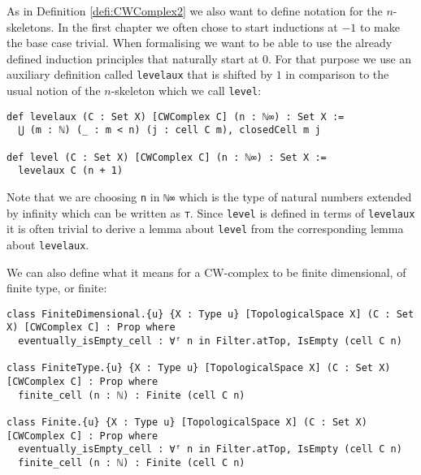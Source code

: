 As in Definition \ref{defi:CWComplex2} we also want to define notation for the $n$-skeletons.
In the first chapter we often chose to start inductions at $-1$ to make the base case trivial.
When formalising we want to be able to use the already defined induction principles that naturally start at $0$.
For that purpose we use an auxiliary definition called \lstinline{levelaux} that is shifted by $1$ in comparison to the usual notion of the $n$-skeleton which we call \lstinline{level}: 
\href{https://github.com/scholzhannah/CWComplexes/blob/7be4872a05b534011cc969eb5b80a4b7f0bf57e2/CWcomplexes/Definition.lean#L137-L146}{\faExternalLink}

\begin{lstlisting}
def levelaux (C : Set X) [CWComplex C] (n : ℕ∞) : Set X :=
  ⋃ (m : ℕ) (_ : m < n) (j : cell C m), closedCell m j

def level (C : Set X) [CWComplex C] (n : ℕ∞) : Set X :=
  levelaux C (n + 1)
\end{lstlisting}

Note that we are choosing \lstinline{n} in \lstinline{ℕ∞} \href{https://github.com/leanprover-community/mathlib4/blob/ed125a4216d18273cb1b96d4c846d32b85d74faf/Mathlib/Data/ENat/Basic.lean#L27-L35}{\faExternalLink} which is the type of natural numbers extended by infinity which can be written as \lstinline{⊤}.
Since \lstinline{level} is defined in terms of \lstinline{levelaux} it is often trivial to derive a lemma about \lstinline{level} from the corresponding lemma about \lstinline{levelaux}.

We can also define what it means for a CW-complex to be finite dimensional, of finite type, or finite:
\href{https://github.com/scholzhannah/CWComplexes/blob/7be4872a05b534011cc969eb5b80a4b7f0bf57e2/CWcomplexes/Finite.lean#L28-L43}{\faExternalLink}

\begin{lstlisting}
class FiniteDimensional.{u} {X : Type u} [TopologicalSpace X] (C : Set X) [CWComplex C] : Prop where
  eventually_isEmpty_cell : ∀ᶠ n in Filter.atTop, IsEmpty (cell C n)

class FiniteType.{u} {X : Type u} [TopologicalSpace X] (C : Set X) [CWComplex C] : Prop where
  finite_cell (n : ℕ) : Finite (cell C n)

class Finite.{u} {X : Type u} [TopologicalSpace X] (C : Set X) [CWComplex C] : Prop where
  eventually_isEmpty_cell : ∀ᶠ n in Filter.atTop, IsEmpty (cell C n)
  finite_cell (n : ℕ) : Finite (cell C n)
\end{lstlisting}

